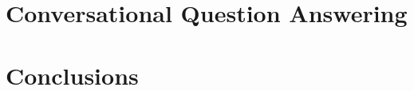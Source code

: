 \documentclass[12pt]{report}
\begin{document}
\chapter{Conversational Question Answering}
\label{chapter:coqa}







\chapter{Conclusions}
\label{chapter:conclusions}




\end{document}
